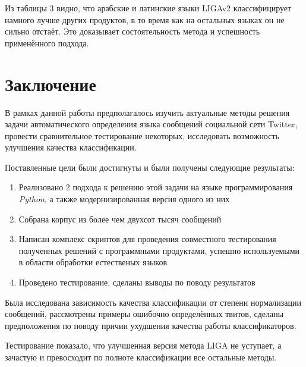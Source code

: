 \documentclass[a4paper, 14pt]{article}
\begin{document}
		Из таблицы 3 видно, что арабские и латинские языки LIGAv2 классифицирует намного лучше других продуктов, в то время как на остальных языках
		он не сильно отстаёт. Это доказывает состоятельность метода и успешность применённого подхода. 
		
		

\pagebreak
	
\section{Заключение}
		В рамках данной работы предполагалось изучить актуальные методы решения задачи автоматического определения языка сообщений социальной сети Twitter, провести сравнительное тестирование некоторых, исследовать возможность улучшения качества классификации. 
		
		Поставленные цели были достигнуты и были получены следующие результаты:
		\begin{enumerate}
			\item Реализовано 2 подхода к решению этой задачи на языке программирования \textit{Python}, а также модернизированная версия одного из них
			\item Собрана корпус из более чем двухсот тысяч сообщений
			\item Написан комплекс скриптов для проведения совместного тестирования полученных решений с программными продуктами, успешно используемыми в области обработки естественых языков
			\item Проведено тестирование, сделаны выводы по поводу результатов
		\end{enumerate}
		Была исследована зависимость качества классификации от степени нормализации сообщений, 
		рассмотрены примеры ошибочно определённых твитов, сделаны предположения по поводу причин ухудшения качества работы классификаторов.
		
		Тестирование показало, что улучшенная версия метода LIGA не уступает, а зачастую и превосходит по полноте классификации все остальные методы.
		
		
\end{document}
